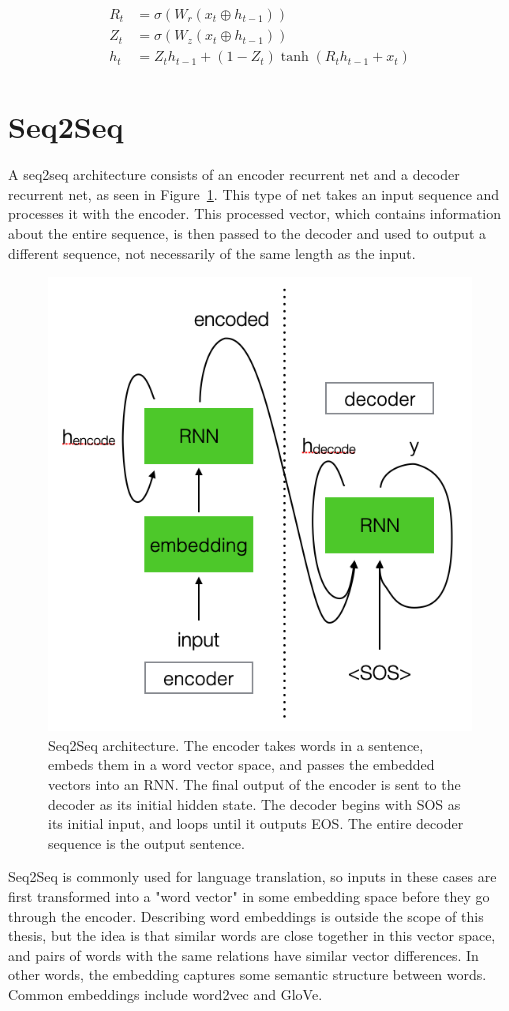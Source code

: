 \begin{align}
    R_t &= \sigma(W_r (x_t \oplus h_{t-1})) \\
    Z_t &= \sigma(W_z (x_t \oplus h_{t-1})) \\
    h_t &= Z_t h_{t-1} + (1-Z_t)\tanh(R_t h_{t-1} + x_t)
\end{align}

\section{Seq2Seq}

A seq2seq architecture consists of an encoder recurrent net and a decoder recurrent net, as seen in Figure~\ref{fig:seq2seq}. This type of net takes an input sequence and processes it with the encoder. This processed vector, which contains information about the entire sequence, is then passed to the decoder and used to output a different sequence, not necessarily of the same length as the input.

\begin{figure}[htbp]
    \centering
    \includegraphics[width=0.55\linewidth]{Images/ML/seq2seq.png}
    \caption{Seq2Seq architecture. The encoder takes words in a sentence, embeds them in a word vector space, and passes the embedded vectors into an RNN. The final output of the encoder is sent to the decoder as its initial hidden state. The decoder begins with SOS as its initial input, and loops until it outputs EOS. The entire decoder sequence is the output sentence.}
    \label{fig:seq2seq}
\end{figure}

Seq2Seq is commonly used for language translation, so inputs in these cases are first transformed into a "word vector" in some embedding space before they go through the encoder. Describing word embeddings is outside the scope of this thesis, but the idea is that similar words are close together in this vector space, and pairs of words with the same relations have similar vector differences. In other words, the embedding captures some semantic structure between words. Common embeddings include word2vec and GloVe.

